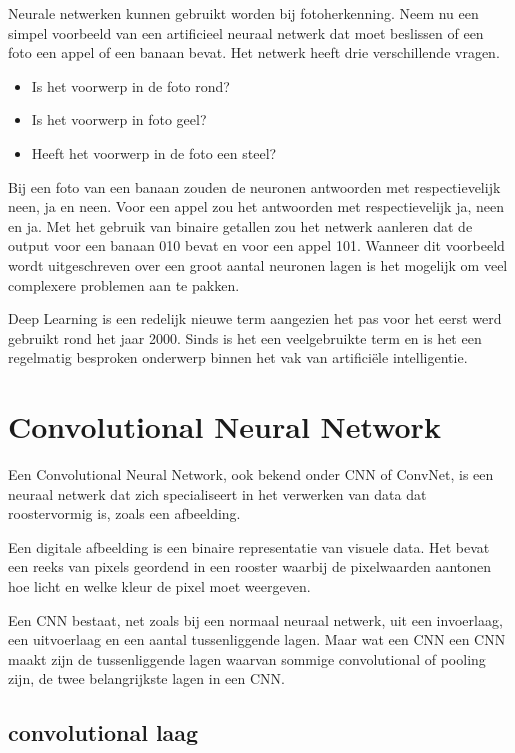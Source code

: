 Neurale netwerken kunnen gebruikt worden bij fotoherkenning.
Neem nu een simpel voorbeeld van een artificieel neuraal netwerk dat moet beslissen of een foto een appel of een banaan bevat.
Het netwerk heeft drie verschillende vragen.


\begin{itemize}
	\item Is het voorwerp in de foto rond?
	\item Is het voorwerp in foto geel?
	\item Heeft het voorwerp in de foto een steel?
\end{itemize}

Bij een foto van een banaan zouden de neuronen antwoorden met respectievelijk neen, ja en neen. Voor een appel zou het antwoorden met respectievelijk ja, neen en ja. Met het gebruik van binaire getallen zou het netwerk aanleren dat de output voor een banaan 010 bevat en voor een appel 101.
Wanneer dit voorbeeld wordt uitgeschreven over een groot aantal neuronen lagen is het mogelijk om veel complexere problemen aan te pakken.

Deep Learning is een redelijk nieuwe term aangezien het pas voor het eerst werd gebruikt rond het jaar 2000. Sinds is het een veelgebruikte term en is het een regelmatig besproken onderwerp binnen het vak van artificiële intelligentie. \autocite{Goff2018}


\section{Convolutional Neural Network}

Een Convolutional Neural Network, ook bekend onder CNN of ConvNet, is een neuraal netwerk dat zich specialiseert in het verwerken van data dat roostervormig is, zoals een afbeelding.

Een digitale afbeelding is een binaire representatie van visuele data. Het bevat een reeks van pixels geordend in een rooster waarbij de pixelwaarden aantonen hoe licht en welke kleur de pixel moet weergeven.

Een CNN bestaat, net zoals bij een normaal neuraal netwerk, uit een invoerlaag, een uitvoerlaag en een aantal tussenliggende lagen.
Maar wat een CNN een CNN maakt zijn de tussenliggende lagen waarvan sommige convolutional of pooling zijn, de twee belangrijkste lagen in een CNN.

\subsection{convolutional laag}




